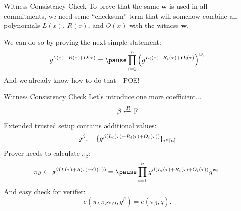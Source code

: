 \documentclass{zkdl-presentation-template}
\begin{document}
    \begin{frame}{Witness Consistency Check}
        \pause
        To prove that the same $\mathbf{w}$ is used in all commitments, we need some ``checksum''
        term that will somehow combine all polynomials $L(x)$, $R(x)$, and $O(x)$ with the witness
        $\mathbf{w}$.

        \pause
        We can do so by proving the next simple statement:
        \vspace{-5pt}
        \begin{equation*}
            g^{L(\tau) + R(\tau) + O(\tau)} = \pause \prod_{i=1}^n {\left(g^{L_i(\tau) + R_i(\tau) + O_i(\tau)}\right)}^{w_i}
            \vspace{-5pt}
        \end{equation*}
        \pause
        And we already know how to do that - POE!
    \end{frame}

    \begin{frame}{Witness Consistency Check}
        Let's introduce one more coefficient...
        \vspace{-5pt}
        \begin{equation*}
            \beta \xleftarrow{R} \mathbb{F}
            \vspace{-5pt}
        \end{equation*}
        \pause
        Extended trusted setup contains additional values:
        \vspace{-5pt}
        \begin{equation*}
            g^{\beta}, \quad \{g^{\beta(L_i(\tau) + R_i(\tau) + O_i(\tau))}\}_{i \in \left[ n \right]}
            \vspace{-5pt}
        \end{equation*}
        \pause
        Prover needs to calculate $\pi_{\beta}$:
        \vspace{-5pt}
        \begin{equation*}
            \pi_{\beta} \gets g^{\beta(L(\tau) + R(\tau) + O(\tau))} = \pause \prod_{i=1}^{n} g^{\beta(L_i(\tau) + R_i(\tau) + O_i(\tau))}g^{w_i}\
        \end{equation*}
        \pause
        And easy check for verifier:
        \vspace{-5pt}
        \begin{equation*}
            e(\pi_L\pi_R\pi_O, g^{\beta}) = e(\pi_{\beta}, g).
        \end{equation*}
    \end{frame}
\end{document}
